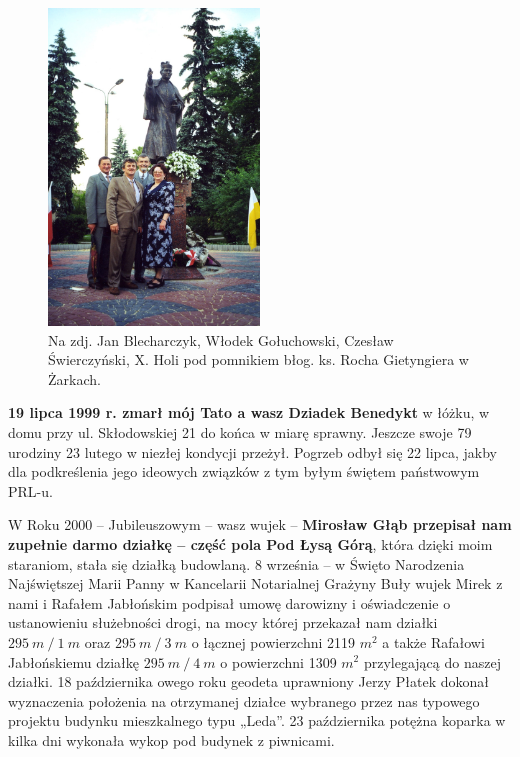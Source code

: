 \begin{figure}[!h]
\begin{center}
\includegraphics[width=0.5\textwidth]{photo/krystyna_jan_blecharczykowie.jpg}
\caption[Jan Blecharczyk, Włodek Gołuchowski, Czesław Świerczyński, X. Holi pod pomnikiem błog. ks. Rocha Gietyngiera w Żarkach]{Na zdj. Jan Blecharczyk, Włodek Gołuchowski, Czesław Świerczyński, X. Holi pod pomnikiem błog. ks. Rocha Gietyngiera w Żarkach.}
\end{center}
\end{figure}

\textbf{19 lipca 1999 r. zmarł mój Tato a wasz Dziadek Benedykt} w łóżku, w domu przy ul. Skłodowskiej 21 do końca w miarę sprawny. Jeszcze swoje 79 urodziny 23 lutego w niezłej kondycji przeżył. Pogrzeb odbył się 22 lipca, jakby dla podkreślenia jego ideowych związków z tym byłym świętem państwowym PRL-u.

W Roku 2000 -- Jubileuszowym -- wasz wujek -- \textbf{Mirosław Głąb przepisał nam zupełnie darmo działkę – część pola Pod Łysą Górą}, która dzięki moim staraniom, stała się działką budowlaną. 8 września – w Święto Narodzenia Najświętszej Marii Panny w Kancelarii Notarialnej Grażyny Buły wujek Mirek z nami i Rafałem Jabłońskim podpisał umowę darowizny i oświadczenie o ustanowieniu służebności drogi, na mocy której przekazał nam działki $295~m~/~1~m$ oraz $295~m~/~3~m$ o łącznej powierzchni 2119 $m^{2}$ a także Rafałowi Jabłońskiemu działkę $295~m~/~4~m$ o powierzchni 1309 $m^{2}$ przylegającą do naszej działki. 18 października owego roku geodeta uprawniony Jerzy Płatek dokonał wyznaczenia położenia na otrzymanej  działce wybranego przez nas typowego projektu budynku mieszkalnego typu „Leda”. 23 października potężna koparka w kilka dni wykonała wykop pod budynek z piwnicami.

